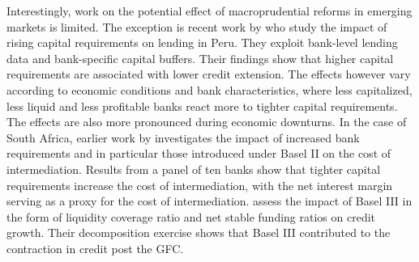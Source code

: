 \documentclass[
  letterpaper,
  DIV=11,
  numbers=noendperiod]{scrartcl}
\begin{document}
Interestingly, work on the potential effect of macroprudential reforms
in emerging markets is limited. The exception is recent work by
\cite{fang2022bank} who study the impact of rising capital requirements
on lending in Peru. They exploit bank-level lending data and
bank-specific capital buffers. Their findings show that higher capital
requirements are associated with lower credit extension. The effects
however vary according to economic conditions and bank characteristics,
where less capitalized, less liquid and less profitable banks react more
to tighter capital requirements. The effects are also more pronounced
during economic downturns. In the case of South Africa, earlier work by
\cite{maredza2016capital} investigates the impact of increased bank
requirements and in particular those introduced under Basel II on the
cost of intermediation. Results from a panel of ten banks show that
tighter capital requirements increase the cost of intermediation, with
the net interest margin serving as a proxy for the cost of
intermediation. \cite{gumata2017bank} assess the impact of Basel III in
the form of liquidity coverage ratio and net stable funding ratios on
credit growth. Their decomposition exercise shows that Basel III
contributed to the contraction in credit post the GFC.
\end{document}
